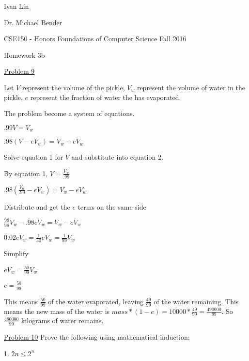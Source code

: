 \documentclass[12pt]{article}[12pt]
\begin{document}
Ivan Lin

Dr. Michael Bender

CSE150 - Honors Foundations of Computer Science Fall 2016

\begin{center}
Homework 3b
\end{center}

\underline{Problem 9}

Let $V$ represent the volume of the pickle, $V_w$ represent the volume of water in the pickle, $e$ represent the fraction of water the has evaporated.

The problem become a system of equations.


\begin{addmargin}[1em]{2em}

\indent$.99V=V_w$

\indent$.98(V-eV_w)=V_w-eV_w$

\indent Solve equation 1 for $V$ and substitute into equation 2.

\indent By equation 1, $V=\frac{V_w}{.99}$

\indent$.98(\frac{V_w}{.99}-eV_w)=V_w-eV_w$

\indent Distribute and get the $e$ terms on the same side

\indent$\frac{98}{99}V_w-.98eV_w=V_w-eV_w$

\indent$0.02eV_w=\frac{1}{50}eV_w=\frac{1}{99}V_w$

\indent Simplify

\indent$eV_w=\frac{50}{99}V_w$

\indent$e=\frac{50}{99}$

This means $\frac{50}{99}$ of the water evaporated, leaving $\frac{49}{99}$ of the water remaining. This means the new mass of the water is $mass*(1-e)=10000*\frac{49}{99}=\frac{490000}{99}$. So $\frac{490000}{99}$ kilograms of water remains.
\end{addmargin}
\bigskip
\underline{Problem 10}
\smallskip
Prove the following using mathematical induction:

1. $2n \leq 2^n$
\end{document}

